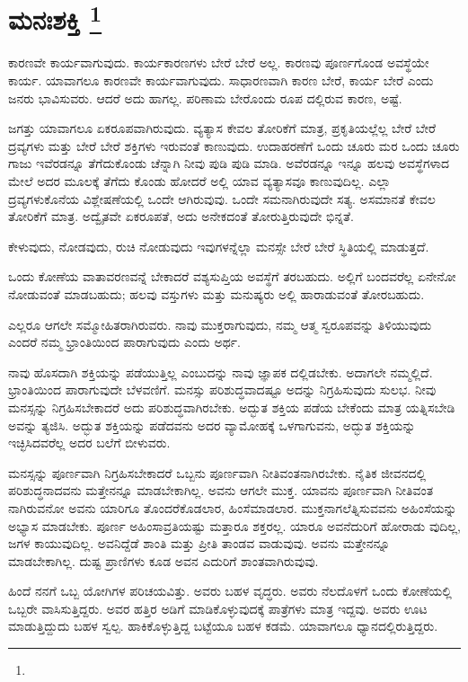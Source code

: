 
\chapter[ಮನಃಶಕ್ತಿ ]{ಮನಃಶಕ್ತಿ \protect\footnote{}}

ಕಾರಣವೇ ಕಾರ್ಯವಾಗುವುದು. ಕಾರ್ಯಕಾರಣಗಳು ಬೇರೆ ಬೇರೆ ಅಲ್ಲ. ಕಾರಣವು ಪೂರ್ಣಗೊಂಡ ಅವಸ್ಥೆಯೇ ಕಾರ್ಯ. ಯಾವಾಗಲೂ ಕಾರಣವೇ ಕಾರ್ಯವಾಗುವುದು. ಸಾಧಾರಣವಾಗಿ ಕಾರಣ ಬೇರೆ, ಕಾರ್ಯ ಬೇರೆ ಎಂದು ಜನರು ಭಾವಿಸುವರು. ಆದರೆ ಅದು ಹಾಗಲ್ಲ. ಪರಿಣಾಮ ಬೇರೊಂದು ರೂಪ ದಲ್ಲಿರುವ ಕಾರಣ, ಅಷ್ಟೆ.

ಜಗತ್ತು ಯಾವಾಗಲೂ ಏಕರೂಪವಾಗಿರುವುದು. ವ್ಯತ್ಯಾಸ ಕೇವಲ ತೋರಿಕೆಗೆ ಮಾತ್ರ, ಪ್ರಕೃತಿಯಲ್ಲೆಲ್ಲ ಬೇರೆ ಬೇರೆ ದ್ರವ್ಯಗಳು ಮತ್ತು ಬೇರೆ ಬೇರೆ ಶಕ್ತಿಗಳು ಇರುವಂತೆ ಕಾಣುವುದು. ಉದಾಹರಣೆಗೆ ಒಂದು ಚೂರು ಮರ ಒಂದು ಚೂರು ಗಾಜು ಇವೆರಡನ್ನೂ ತೆಗೆದುಕೊಂಡು ಚೆನ್ನಾಗಿ ನೀವು ಪುಡಿ ಪುಡಿ ಮಾಡಿ. ಅವೆರಡನ್ನೂ ಇನ್ನೂ ಹಲವು ಅವಸ್ಥೆಗಳಾದ ಮೇಲೆ ಅದರ ಮೂಲಕ್ಕೆ ತೆಗೆದು ಕೊಂಡು ಹೋದರೆ ಅಲ್ಲಿ ಯಾವ ವ್ಯತ್ಯಾಸವೂ ಕಾಣುವುದಿಲ್ಲ. ಎಲ್ಲಾ ದ್ರವ್ಯಗಳುಕೊನೆಯ ವಿಶ್ಲೇಷಣೆಯಲ್ಲಿ ಒಂದೇ ಆಗಿರುವುವು. ಒಂದೇ ಸಮನಾಗಿರುವುದೇ ಸತ್ಯ. ಅಸಮಾನತೆ ಕೇವಲ ತೋರಿಕೆಗೆ ಮಾತ್ರ. ಅದ್ವೈತವೇ ಏಕರೂಪತೆ, ಅದು ಅನೇಕದಂತೆ ತೋರುತ್ತಿರುವುದೇ ಭಿನ್ನತೆ.

ಕೇಳುವುದು, ನೋಡವುದು, ರುಚಿ ನೋಡುವುದು ಇವುಗಳನ್ನೆಲ್ಲಾ ಮನಸ್ಸೇ ಬೇರೆ ಬೇರೆ ಸ್ಥಿತಿಯಲ್ಲಿ ಮಾಡುತ್ತದೆ.

ಒಂದು ಕೋಣೆಯ ವಾತಾವರಣವನ್ನೆ ಬೇಕಾದರೆ ವಶ್ಯಸುಪ್ತಿಯ ಅವಸ್ಥೆಗೆ ತರಬಹುದು. ಅಲ್ಲಿಗೆ ಬಂದವರೆಲ್ಲ ಏನೇನೋ ನೋಡುವಂತೆ ಮಾಡಬಹುದು; ಹಲವು ವಸ್ತುಗಳು ಮತ್ತು ಮನುಷ್ಯರು ಅಲ್ಲಿ ಹಾರಾಡುವಂತೆ ತೋರಬಹುದು.

ಎಲ್ಲರೂ ಆಗಲೇ ಸಮ್ಮೋಹಿತರಾಗಿರುವರು. ನಾವು ಮುಕ್ತರಾಗುವುದು, ನಮ್ಮ ಆತ್ಮ ಸ್ವರೂಪವನ್ನು ತಿಳಿಯುವುದು ಎಂದರೆ ನಮ್ಮ ಭ್ರಾಂತಿಯಿಂದ ಪಾರಾಗುವುದು ಎಂದು ಅರ್ಥ.

ನಾವು ಹೊಸದಾಗಿ ಶಕ್ತಿಯನ್ನು ಪಡೆಯುತ್ತಿಲ್ಲ ಎಂಬುದನ್ನು ನಾವು ಜ್ಞಾಪಕ ದಲ್ಲಿಡಬೇಕು. ಅದಾಗಲೇ ನಮ್ಮಲ್ಲಿದೆ. ಭ್ರಾಂತಿಯಿಂದ ಪಾರಾಗುವುದೇ ಬೆಳವಣಿಗೆ. ಮನಸ್ಸು ಪರಿಶುದ್ಧವಾದಷ್ಟೂ ಅದನ್ನು ನಿಗ್ರಹಿಸುವುದು ಸುಲಭ. ನೀವು ಮನಸ್ಸನ್ನು ನಿಗ್ರಹಿಸಬೇಕಾದರೆ ಅದು ಪರಿಶುದ್ಧವಾಗಿರಬೇಕು. ಅದ್ಭುತ ಶಕ್ತಿಯ ಪಡೆಯ ಬೇಕೆಂದು ಮಾತ್ರ ಯತ್ನಿಸಬೇಡಿ ಅವನ್ನು ತ್ಯಜಿಸಿ. ಅದ್ಭುತ ಶಕ್ತಿಯನ್ನು ಪಡೆದವನು ಅದರ ವ್ಯಾಮೋಹಕ್ಕೆ ಒಳಗಾಗುವನು, ಅದ್ಭುತ ಶಕ್ತಿಯನ್ನು ಇಚ್ಛಿಸಿದವರೆಲ್ಲ ಅದರ ಬಲೆಗೆ ಬೀಳುವರು.

ಮನಸ್ಸನ್ನು ಪೂರ್ಣವಾಗಿ ನಿಗ್ರಹಿಸಬೇಕಾದರೆ ಒಬ್ಬನು ಪೂರ್ಣವಾಗಿ ನೀತಿವಂತನಾಗಿರಬೇಕು. ನೈತಿಕ ಜೀವನದಲ್ಲಿ ಪರಿಶುದ್ಧನಾದವನು ಮತ್ತೇನನ್ನೂ ಮಾಡಬೇಕಾಗಿಲ್ಲ. ಅವನು ಆಗಲೇ ಮುಕ್ತ. ಯಾವನು ಪೂರ್ಣವಾಗಿ ನೀತಿವಂತ ನಾಗಿರುವನೋ ಅವನು ಯಾರಿಗೂ ತೊಂದರೆಕೊಡಲಾರ, ಹಿಂಸೆಮಾಡಲಾರ. ಮುಕ್ತನಾಗಲೆತ್ನಿಸುವವನು ಅಹಿಂಸೆಯನ್ನು ಅಭ್ಯಾಸ ಮಾಡಬೇಕು. ಪೂರ್ಣ ಅಹಿಂಸಾವ್ರತಿಯಷ್ಟು ಮತ್ತಾರೂ ಶಕ್ತರಲ್ಲ. ಯಾರೂ ಅವನೆದುರಿಗೆ ಹೋರಾಡು ವುದಿಲ್ಲ, ಜಗಳ ಕಾಯುವುದಿಲ್ಲ. ಅವನಿದ್ದೆಡೆ ಶಾಂತಿ ಮತ್ತು ಪ್ರೀತಿ ತಾಂಡವ ವಾಡುವುವು. ಅವನು ಮತ್ತೇನನ್ನೂ ಮಾಡಬೇಕಾಗಿಲ್ಲ. ದುಷ್ಟ ಪ್ರಾಣಿಗಳು ಕೂಡ ಅವನ ಎದುರಿಗೆ ಶಾಂತವಾಗಿರುವುವು.

ಹಿಂದೆ ನನಗೆ ಒಬ್ಬ ಯೋಗಿಗಳ ಪರಿಚಯವಿತ್ತು. ಅವರು ಬಹಳ ವೃದ್ಧರು. ಅವರು ನೆಲದೊಳಗೆ ಒಂದು ಕೋಣೆಯಲ್ಲಿ ಒಬ್ಬರೇ ವಾಸಿಸುತ್ತಿದ್ದರು. ಅವರ ಹತ್ತಿರ ಅಡಿಗೆ ಮಾಡಿಕೊಳ್ಳುವುದಕ್ಕೆ ಪಾತ್ರೆಗಳು ಮಾತ್ರ ಇದ್ದವು. ಅವರು ಊಟ ಮಾಡುತ್ತಿದ್ದುದು ಬಹಳ ಸ್ವಲ್ಪ. ಹಾಕಿಕೊಳ್ಳುತ್ತಿದ್ದ ಬಟ್ಟೆಯೂ ಬಹಳ ಕಡಮೆ. ಯಾವಾಗಲೂ ಧ್ಯಾನದಲ್ಲಿರುತ್ತಿದ್ದರು.

